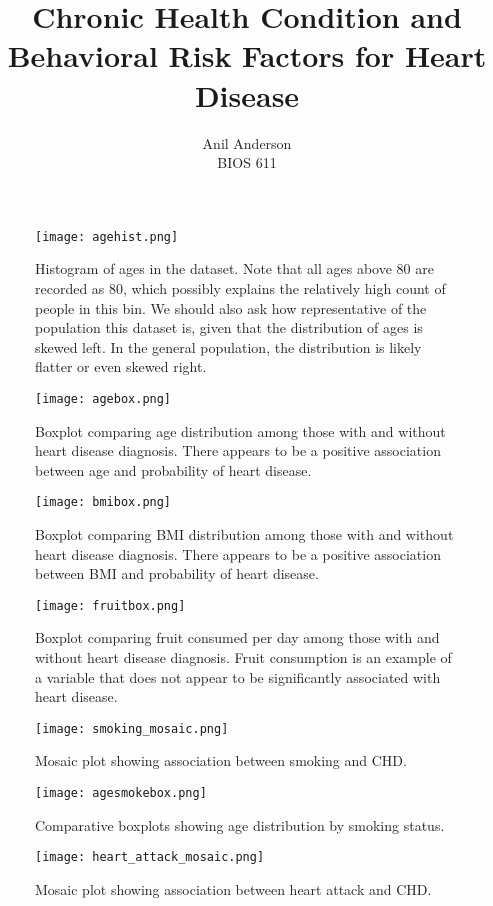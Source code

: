 \documentclass[12pt]{article}
\begin{document}
 
\title{Chronic Health Condition and Behavioral Risk Factors for Heart Disease}
\author{Anil Anderson\\
BIOS 611}
 
\maketitle


\begin{figure}[htbp]
\centering
\texttt{[image: agehist.png]}
\caption{Histogram of ages in the dataset. Note that all ages above 80 are recorded as 80, which possibly explains the relatively high count of people in this bin. We should also ask how representative of the population this dataset is, given that the distribution of ages is skewed left. In the general population, the distribution is likely flatter or even skewed right.}
\end{figure}

\begin{figure}[htbp]
\centering
\texttt{[image: agebox.png]}
\caption{Boxplot comparing age distribution among those with and without heart disease diagnosis. There appears to be a positive association between age and probability of heart disease.}
\end{figure}

\begin{figure}[htbp]
\centering
\texttt{[image: bmibox.png]}
\caption{Boxplot comparing BMI distribution among those with and without heart disease diagnosis. There appears to be a positive association between BMI and probability of heart disease.}
\end{figure}

\begin{figure}[htbp]
\centering
\texttt{[image: fruitbox.png]}
\caption{Boxplot comparing fruit consumed per day among those with and without heart disease diagnosis. Fruit consumption is an example of a variable that does not appear to be significantly associated with heart disease.}
\end{figure}

\begin{figure}[htbp]
\centering
\texttt{[image: smoking\_mosaic.png]}
\caption{Mosaic plot showing association between smoking and CHD.}
\end{figure}

\begin{figure}[htbp]
\centering
\texttt{[image: agesmokebox.png]}
\caption{Comparative boxplots showing age distribution by smoking status.}
\end{figure}

\begin{figure}[htbp]
\centering
\texttt{[image: heart\_attack\_mosaic.png]}
\caption{Mosaic plot showing association between heart attack and CHD.}
\end{figure}
\end{document}
